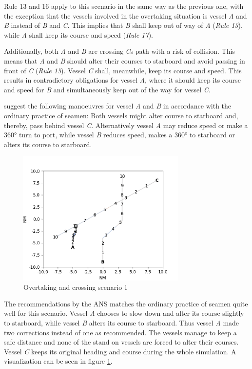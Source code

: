Rule 13 and 16 apply to this scenario in the same way as the previous one, with the exception that the vessels involved in the overtaking situation is vessel \textit{A} and \textit{B} instead of \textit{B} and \textit{C}. This implies that \textit{B} shall keep out of way of \textit{A} (\textit{Rule 13}), while \textit{A} shall keep its course and speed (\textit{Rule 17}).

Additionally, both \textit{A} and \textit{B} are crossing \textit{C}s path with a risk of collision. This means that \textit{A} and \textit{B} should alter their courses to starboard and avoid passing in front of \textit{C} (\textit{Rule 15}). Vessel \textit{C} shall, meanwhile, keep its course and speed. This results in contradictory obligations for vessel  \textit{A}, where it should keep its course and speed for \textit{B} and simultaneously keep out of the way for vessel \textit{C}.

\textcite{ecolreg_overtaking-and-crossing} suggest the following manoeuvres for vessel \textit{A} and \textit{B} in accordance with the ordinary practice of seamen:
Both vessels might alter course to starboard and, thereby, pass behind vessel \textit{C}. Alternatively vessel \textit{A} may reduce speed or make a \ang{360} turn to port, while vessel \textit{B} reduces speed, makes a \ang{360} to starboard or alters its course to starboard.

\begin{figure}[H]
    \centering
    \includegraphics[width=0.75\textwidth,height=0.75\textheight,keepaspectratio]{../src/img/overtaking_crossing_res.png}
    \caption{Overtaking and crossing scenario 1}
    \label{fig:overtaking-and-crossing-res}
\end{figure}

The recommendations by the ANS matches the ordinary practice of seamen quite well for this scenario. Vessel \textit{A} chooses to slow down and alter its course slightly to starboard, while vessel \textit{B} alters its course to starboard. Thus vessel \textit{A} made two corrections instead of one as recommended.  The vessels manage to keep a safe distance and none of the stand on vessels are forced to alter their courses. Vessel \textit{C} keeps its original heading and course during the whole simulation. A visualization can be seen in figure \ref {fig:overtaking-and-crossing-res}.

